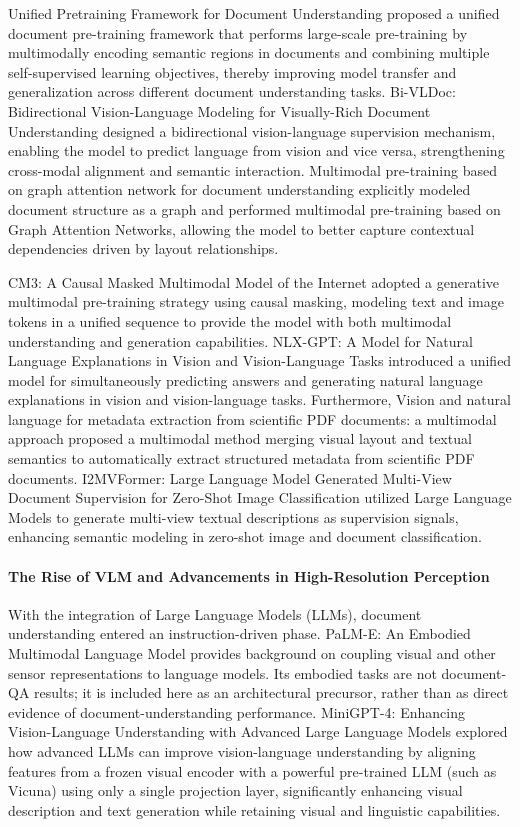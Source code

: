 Unified Pretraining Framework for Document Understanding \cite{wang2022unified} proposed a unified document pre-training framework that performs large-scale pre-training by multimodally encoding semantic regions in documents and combining multiple self-supervised learning objectives, thereby improving model transfer and generalization across different document understanding tasks. Bi-VLDoc: Bidirectional Vision-Language Modeling for Visually-Rich Document Understanding \cite{yang2022bivldoc} designed a bidirectional vision-language supervision mechanism, enabling the model to predict language from vision and vice versa, strengthening cross-modal alignment and semantic interaction. Multimodal pre-training based on graph attention network for document understanding \cite{liu2022gatdoc} explicitly modeled document structure as a graph and performed multimodal pre-training based on Graph Attention Networks, allowing the model to better capture contextual dependencies driven by layout relationships.

CM3: A Causal Masked Multimodal Model of the Internet \cite{ai2022cm3} adopted a generative multimodal pre-training strategy using causal masking, modeling text and image tokens in a unified sequence to provide the model with both multimodal understanding and generation capabilities. NLX-GPT: A Model for Natural Language Explanations in Vision and Vision-Language Tasks \cite{kayser2022nlxgpt} introduced a unified model for simultaneously predicting answers and generating natural language explanations in vision and vision-language tasks. Furthermore, Vision and natural language for metadata extraction from scientific PDF documents: a multimodal approach \cite{li2022pdfmeta} proposed a multimodal method merging visual layout and textual semantics to automatically extract structured metadata from scientific PDF documents. I2MVFormer: Large Language Model Generated Multi-View Document Supervision for Zero-Shot Image Classification \cite{zhao2022i2mvformer} utilized Large Language Models to generate multi-view textual descriptions as supervision signals, enhancing semantic modeling in zero-shot image and document classification.

\paragraph{The Rise of VLM and Advancements in High-Resolution Perception}
With the integration of Large Language Models (LLMs), document understanding entered an instruction-driven phase. PaLM-E: An Embodied Multimodal Language Model \cite{driess2023palme} provides background on coupling visual and other sensor representations to language models. Its embodied tasks are not document-QA results; it is included here as an architectural precursor, rather than as direct evidence of document-understanding performance. MiniGPT-4: Enhancing Vision-Language Understanding with Advanced Large Language Models \cite{zhu2023minigpt4} explored how advanced LLMs can improve vision-language understanding by aligning features from a frozen visual encoder with a powerful pre-trained LLM (such as Vicuna) using only a single projection layer, significantly enhancing visual description and text generation while retaining visual and linguistic capabilities.

